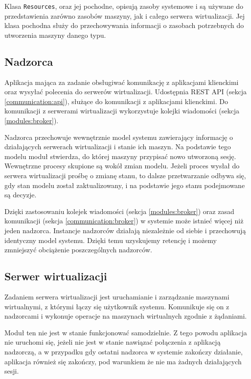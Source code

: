 \documentclass[../opis-rozwiazania.tex]{subfiles}
\begin{document}
Klasa \texttt{Resources}, oraz jej pochodne, opisują zasoby systemowe i są używane do przedstawienia zarówno zasobów maszyny, jak i całego serwera wirtualizacji. Jej klasa pochodna \texttt{} służy do przechowywania informacji o zasobach potrzebnych do utworzenia maszyny danego typu.

\subsection{Nadzorca}
\label{modules:overseer}

Aplikacja mająca za zadanie obsługiwać komunikację z aplikacjami klienckimi oraz wysyłać polecenia do serwerów wirtualizacji. Udostępnia REST API (sekcja \ref{communication:api}), służące do komunikacji z aplikacjami klienckimi. Do komunikacji z serwerami wirtualizacji wykorzystuje kolejki wiadomości (sekcja \ref{modules:broker}).

Nadzorca przechowuje wewnętrznie model systemu zawierający informację o działających serwerach wirtualizacji i stanie ich maszyn. Na podstawie tego modelu moduł stwierdza, do której maszyny przypisać nowo utworzoną sesję. Wewnętrzne procesy skupione są wokół zmian modelu. Jeżeli proces wysłał do serwera wirtualizacji prośbę o zmianę stanu, to dalsze przetwarzanie odbywa się, gdy stan modelu został zaktualizowany, i na podstawie jego stanu podejmowane są decyzje.

Dzięki zastosowaniu kolejek wiadomości (sekcja \ref{modules:broker}) oraz zasad komunikacji (sekcja \ref{communication:broker}) w systemie może istnieć więcej niż jeden nadzorca. Instancje nadzorców działają niezależnie od siebie i przechowują identyczny model systemu. Dzięki temu uzyskujemy retencję i możemy zmniejszyć obciążenie poszczególnych nadzorców.

\subsection{Serwer wirtualizacji}
\label{modules:virtsrv}

Zadaniem serwera wirtualizacji jest uruchamianie i zarządzanie maszynami wirtualnymi, z którymi łączy się użytkownik systemu. Komunikuje się on z nadzorcami i wykonuje operacje na maszynach wirtualnych zgodnie z żądaniami.

Moduł ten nie jest w stanie funkcjonować samodzielnie. Z tego powodu aplikacja nie uruchomi się, jeżeli nie jest w stanie nawiązać połączenia z aplikacją nadzorczą, a w przypadku gdy ostatni nadzorca w systemie zakończy działanie, aplikacja również się zakończy, pod warunkiem że nie ma żadnych działających sesji.
\end{document}
